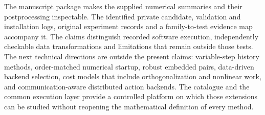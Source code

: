 The manuscript package makes the supplied numerical summaries and
their postprocessing inspectable.  The identified private candidate, validation and installation logs,
original experiment records and a family-to-test evidence map accompany it.
The claims distinguish recorded software execution, independently
checkable data transformations and limitations that remain outside
those tests.  The next
technical directions are outside the present claims: variable-step history
methods, order-matched numerical startup, robust embedded pairs, data-driven
backend selection, cost models that include orthogonalization and nonlinear
work, and communication-aware distributed action backends.  The catalogue and
the common execution layer provide a controlled platform on which those
extensions can be studied without reopening the mathematical definition of
every method.
